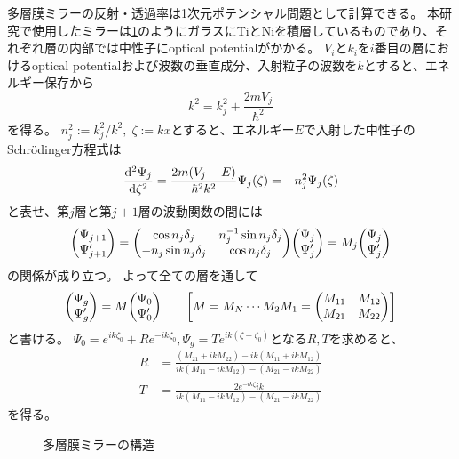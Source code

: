 \documentclass[dvipdfmx]{jsarticle}
\begin{document}
多層膜ミラーの反射・透過率は1次元ポテンシャル問題として計算できる。
本研究で使用したミラーは\ref{fig: multilayer mirror}のようにガラスにTiとNiを積層しているものであり、それぞれ層の内部では中性子にoptical potentialがかかる。\cite{SekY:2011}
$V_i$と$k_i$を$i$番目の層におけるoptical potentialおよび波数の垂直成分、入射粒子の波数を$k$とすると、エネルギー保存から
\begin{equation*}
    k^2
    =
    k_j^2
    +
    \frac{2mV_j}{\hbar^2}
\end{equation*}
を得る。
$n_j^2:={k_j^2}/{k^2},\;\zeta:=kx$とすると、エネルギー$E$で入射した中性子のSchrödinger方程式は
\begin{equation*}
    \dv[2]{\Psi_j}{\zeta}
    =
    \frac{2m(V_j-E)}{\hbar^2k^2}\Psi_j(\zeta)
    =
    -n_j^2\Psi_j(\zeta)
\end{equation*}
と表せ、第$j$層と第$j+1$層の波動関数の間には
\begin{equation*}
    \mqty(\Psi_{j+1} \\ \Psi_{j+1}')
    =
    \mqty(
        \cos n_j\delta_j & n_j^{-1}\sin n_j\delta_j
        \\
        -n_j\sin n_j\delta_j & \cos n_j\delta_j
    )
    \mqty(\Psi_j \\ \Psi_j')
    =
    M_j
    \mqty(\Psi_j \\ \Psi_j')
\end{equation*}
の関係が成り立つ。
よって全ての層を通して
\begin{equation*}
    \mqty(\Psi_g \\ \Psi_g')
    =
    M
    \mqty(\Psi_0 \\ \Psi_0')
    \qquad
    \qty[
        M=M_N\cdots M_2M_1
        =
        \mqty(M_{11} & M_{12} \\ M_{21} & M_{22})
    ]
\end{equation*}
と書ける。
$\Psi_0=e^{ik\zeta_0}+Re^{-ik\zeta_0}, \Psi_g=Te^{ik(\zeta+\zeta_0)}$となる$R, T$を求めると、
\begin{equation*}
    \begin{split}
        R
        &=
        \frac{(M_{21}+ikM_{22})-ik(M_{11}+ikM_{12})}{ik(M_{11}-ikM_{12})-(M_{21}-ikM_{22})}
        \\
        T
        &=
        \frac{2e^{-ik\zeta}ik}{ik(M_{11}-ikM_{12})-(M_{21}-ikM_{22})}
    \end{split}
\end{equation*}
を得る。

\begin{figure}
    \centering
    \caption{多層膜ミラーの構造}
    \label{fig: multilayer mirror}
\end{figure}
\end{document}
